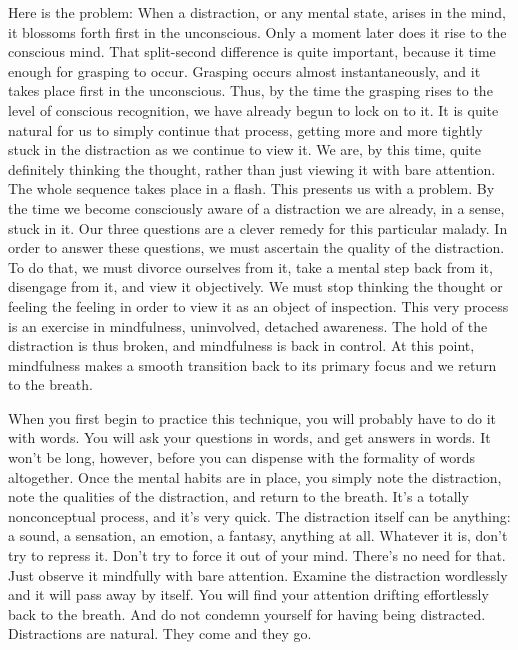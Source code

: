 Here is the problem: When a distraction, or any mental state, arises in the
mind, it blossoms forth first in the unconscious. Only a moment later does it
rise to the conscious mind. That split-second difference is quite important,
because it time enough for grasping to occur. Grasping occurs almost
instantaneously, and it takes place first in the unconscious. Thus, by the time
the grasping rises to the level of conscious recognition, we have already begun
to lock on to it. It is quite natural for us to simply continue that process,
getting more and more tightly stuck in the distraction as we continue to view
it. We are, by this time, quite definitely thinking the thought, rather than
just viewing it with bare attention. The whole sequence takes place in a flash.
This presents us with a problem. By the time we become consciously aware of a
distraction we are already, in a sense, stuck in it. Our three questions are a
clever remedy for this particular malady. In order to answer these questions, we
must ascertain the quality of the distraction. To do that, we must divorce
ourselves from it, take a mental step back from it, disengage from it, and view
it objectively. We must stop thinking the thought or feeling the feeling in
order to view it as an object of inspection. This very process is an exercise in
mindfulness, uninvolved, detached awareness. The hold of the distraction is thus
broken, and mindfulness is back in control. At this point, mindfulness makes a
smooth transition back to its primary focus and we return to the breath.

When you first begin to practice this technique, you will probably have to do it
with words. You will ask your questions in words, and get answers in words. It
won't be long, however, before you can dispense with the formality of words
altogether. Once the mental habits are in place, you simply note the
distraction, note the qualities of the distraction, and return to the breath.
It's a totally nonconceptual process, and it's very quick. The distraction
itself can be anything: a sound, a sensation, an emotion, a fantasy, anything at
all. Whatever it is, don't try to repress it. Don't try to force it out of your
mind. There's no need for that. Just observe it mindfully with bare attention.
Examine the distraction wordlessly and it will pass away by itself. You will
find your attention drifting effortlessly back to the breath. And do not condemn
yourself for having being distracted. Distractions are natural.
They come and they go.

